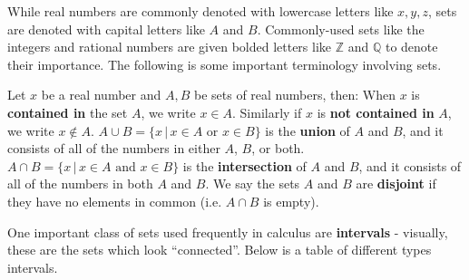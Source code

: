 \documentclass{article}
\newcommand{\tb}[1]{\textbf{#1}}
\begin{document}
While real numbers are commonly denoted with lowercase letters like $x,y,z$, sets are denoted with capital letters like $A$ and $B$. Commonly-used sets like the integers and rational numbers are given bolded letters like $\mathbb{Z}$ and $\mathbb{Q}$ to denote their importance. The following is some important terminology involving sets.

\vspace{5pt}
\begin{outline}
    \0 Let $x$ be a real number and $A, B$ be sets of real numbers, then:
    \1 When $x$ is \tb{contained in} the set $A$, we write $x \in A$. Similarly if $x$ is \tb{not contained in} $A$, we write $x \not\in A$. 
    \1 $A \cup B = \{x \,|\,x\in A \textrm{ or } x \in B\}$ is the \tb{union} of $A$ and $B$, and it consists of all of the numbers in either $A$, $B$, or both.
    \1 $A \cap B = \{x \,|\,x\in A \textrm{ and } x \in B\}$ is the \tb{intersection} of $A$ and $B$, and it consists of all of the numbers in both $A$ and $B$.
    \1 We say the sets $A$ and $B$ are \tb{disjoint} if they have no elements in common (i.e. $A \cap B$ is empty).
\end{outline}

One important class of sets used frequently in calculus are \tb{intervals} - visually, these are the sets which look ``connected''. Below is a table of different types intervals.

\vspace{5pt}
\end{document}
